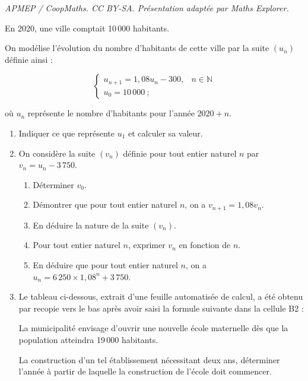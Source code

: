 \documentclass[10pt]{article}
\providecommand{\N}{\mathbb{N}}
\begin{document}
\noindent\textit{APMEP / CoopMaths. CC BY-SA. Présentation adaptée par Maths Explorer.}\par\medskip
En 2020, une ville comptait 10\,000 habitants.

On modélise l'évolution du nombre d'habitants de cette ville par la suite $(u_n)$ définie ainsi :

\[
\begin{cases}
u_{n+1} = 1,08u_n - 300, & n \in \N \\
u_0 = 10\,000~;
\end{cases}
\]

où $u_n$ représente le nombre d'habitants pour l'année $2020 + n$.

\begin{enumerate}
\item Indiquer ce que représente $u_1$ et calculer sa valeur.

\item On considère la suite $(v_n)$ définie pour tout entier naturel $n$ par $v_n = u_n - 3\,750$.
\begin{enumerate}
\item Déterminer $v_0$.
\item Démontrer que pour tout entier naturel $n$, on a $v_{n+1} = 1,08v_n$.
\item En déduire la nature de la suite $(v_n)$.
\item Pour tout entier naturel $n$, exprimer $v_n$ en fonction de $n$.
\item En déduire que pour tout entier naturel $n$, on a $u_n = 6\,250 \times 1,08^n + 3\,750$.
\end{enumerate}

\medskip

\item 

\begin{minipage}[t]{0.6\textwidth}
Le tableau ci-dessous, extrait d'une feuille automatisée de calcul, a été obtenu par recopie vers le bas après avoir saisi la formule suivante dans la cellule B2 :

\begin{center}
\end{center}

La municipalité envisage d'ouvrir une nouvelle école maternelle dès que la population atteindra 19\,000 habitants.

\medskip

La construction d'un tel établissement nécessitant deux ans, déterminer l'année à partir de laquelle la construction de l'école doit commencer.


\end{minipage}
\end{enumerate}
\end{document}
